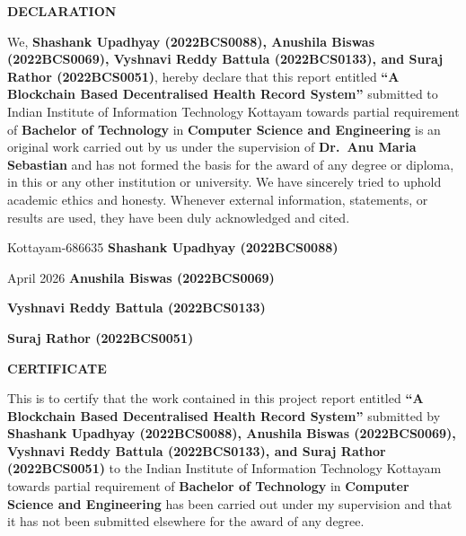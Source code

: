 \documentclass[12pt,a4wide]{report}
\begin{document}
\clearpage
 \setcounter{page}{2}
\begin{center}
{\large{\bf{DECLARATION}}}
\end{center}

\noindent We, \textbf{Shashank Upadhyay (2022BCS0088), Anushila Biswas (2022BCS0069), Vyshnavi Reddy Battula (2022BCS0133), and Suraj Rathor (2022BCS0051)}, hereby declare that this report entitled \textbf{``A Blockchain Based Decentralised Health Record System''} submitted to Indian Institute of Information Technology Kottayam towards partial requirement of {\bf Bachelor of Technology} in \textbf{Computer Science and Engineering} is an original work carried out by us under the supervision of \textbf{Dr.\ Anu Maria Sebastian} and has not formed the basis for the award of any degree or diploma, in this or any other institution or university. We have sincerely tried to uphold academic ethics and honesty. Whenever external information, statements, or results are used, they have been duly acknowledged and cited.

\vspace{4cm}

\noindent Kottayam-686635 \hfill \textbf{Shashank Upadhyay (2022BCS0088)}

\noindent April 2026 \hfill \textbf{Anushila Biswas (2022BCS0069)}

\hfill \textbf{Vyshnavi Reddy Battula (2022BCS0133)}

\hfill \textbf{Suraj Rathor (2022BCS0051)}

\clearpage

 \setcounter{page}{3}
\begin{center}
{\large{\bf{CERTIFICATE}}}
\end{center}

\noindent This is to certify that the work contained in this project report entitled \textbf{``A Blockchain Based Decentralised Health Record System''} submitted by \textbf{Shashank Upadhyay (2022BCS0088), Anushila Biswas (2022BCS0069), Vyshnavi Reddy Battula (2022BCS0133), and Suraj Rathor (2022BCS0051)} to the Indian Institute of Information Technology Kottayam towards partial requirement of {\bf Bachelor of Technology} in \textbf{Computer Science and Engineering} has been carried out under my supervision and that it has not been submitted elsewhere for the award of any degree.
\end{document}
